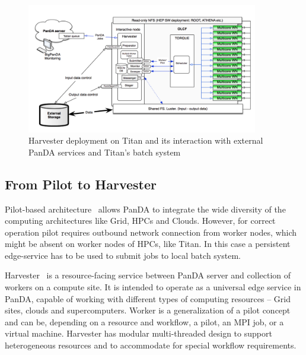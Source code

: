 \documentclass{webofc}
\begin{document}


\begin{figure}
  \centering
  \includegraphics[width=0.90\textwidth]{figures/Panda_at_OLCF.png}
  \caption{Harvester deployment on Titan and its interaction with external PanDA services and Titan's batch system}
  \label{fig:panda-OLCF}
\end{figure}

\subsection{From Pilot to Harvester} \label{section_harvester}

Pilot-based architecture~\cite{Nilsson_2008} allows PanDA to integrate the wide diversity of the computing architectures like Grid,  HPCs and Clouds. However, for correct operation pilot requires outbound network connection from worker nodes, which might be absent on worker nodes of HPCs, like Titan. In this case a persistent edge-service has to be used to submit jobs to local batch system.

Harvester~\cite{Megino_2017} is a resource-facing service between PanDA server and collection of workers on a compute site. It is intended to operate as a universal edge service in PanDA, capable of working with different types of computing resources -- Grid sites, clouds and supercomputers. Worker is a generalization of a pilot concept and can be, depending on a resource and workflow, a pilot, an MPI job, or a virtual machine. Harvester has modular multi-threaded design to support heterogeneous resources and to accommodate for special workflow requirements.
\end{document}
